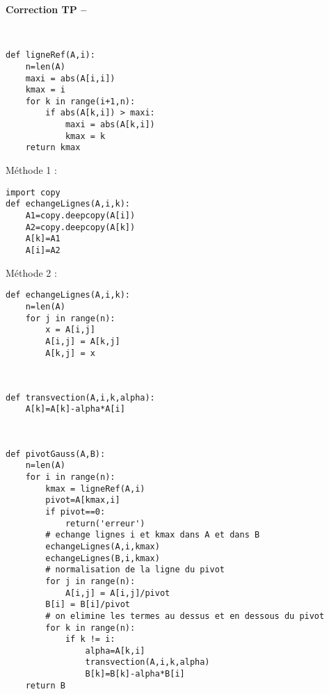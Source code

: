 \ifdef{\public}{}{}

\newpage 

\begin{center}
{\Large\bf Correction TP \no {\numero} -- \descrip}
\end{center}

\begin{solution}~\\
\vspace*{-0.7cm}
\begin{verbatim}
def ligneRef(A,i):
    n=len(A)
    maxi = abs(A[i,i])
    kmax = i
    for k in range(i+1,n):
        if abs(A[k,i]) > maxi:
            maxi = abs(A[k,i])
            kmax = k
    return kmax
\end{verbatim}
\end{solution}


\begin{solution}
Méthode 1 :
\begin{verbatim}
import copy
def echangeLignes(A,i,k):
    A1=copy.deepcopy(A[i])
    A2=copy.deepcopy(A[k])
    A[k]=A1
    A[i]=A2
\end{verbatim}
Méthode 2 :
\begin{verbatim}
def echangeLignes(A,i,k):
    n=len(A)
    for j in range(n):
        x = A[i,j]
        A[i,j] = A[k,j]
        A[k,j] = x
\end{verbatim}
\end{solution}

\begin{solution}~\\
\vspace*{-0.7cm}
\begin{verbatim}
def transvection(A,i,k,alpha):
    A[k]=A[k]-alpha*A[i] 
\end{verbatim}
\end{solution}


\begin{solution}~\\
\vspace*{-0.7cm}
\begin{verbatim}
def pivotGauss(A,B):
    n=len(A)
    for i in range(n):
        kmax = ligneRef(A,i)
        pivot=A[kmax,i]   
        if pivot==0:
            return('erreur')
        # echange lignes i et kmax dans A et dans B
        echangeLignes(A,i,kmax)
        echangeLignes(B,i,kmax)
        # normalisation de la ligne du pivot
        for j in range(n):
            A[i,j] = A[i,j]/pivot   
        B[i] = B[i]/pivot
        # on elimine les termes au dessus et en dessous du pivot
        for k in range(n):
            if k != i:
                alpha=A[k,i]
                transvection(A,i,k,alpha)  
                B[k]=B[k]-alpha*B[i]       
    return B
\end{verbatim}
\end{solution}

